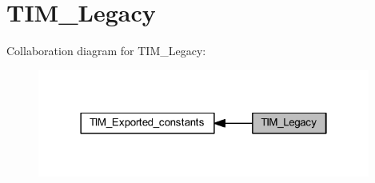 \hypertarget{group___t_i_m___legacy}{}\section{T\+I\+M\+\_\+\+Legacy}
\label{group___t_i_m___legacy}
Collaboration diagram for T\+I\+M\+\_\+\+Legacy\+:
\nopagebreak
\begin{figure}[H]
\begin{center}
\leavevmode
\includegraphics[width=310pt]{group___t_i_m___legacy}
\end{center}
\end{figure}
